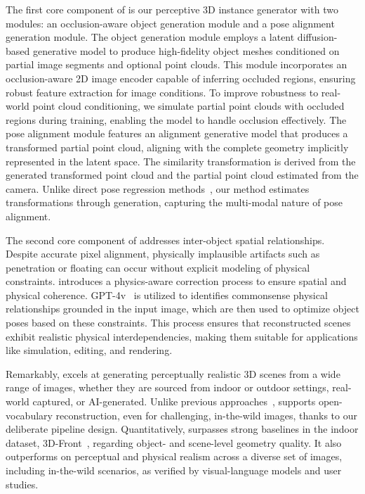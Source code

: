 The first core component of \methodname is our perceptive 3D instance generator with two modules: an occlusion-aware object generation module and a pose alignment generation module. The object generation module employs a latent diffusion-based generative model to produce high-fidelity object meshes conditioned on partial image segments and optional point clouds. This module incorporates an occlusion-aware 2D image encoder capable of inferring occluded regions, ensuring robust feature extraction for image conditions. To improve robustness to real-world point cloud conditioning, we simulate partial point clouds with occluded regions during training, enabling the model to handle occlusion effectively. 
The pose alignment module features an alignment generative model that produces a transformed partial point cloud, aligning with the complete geometry implicitly represented in the latent space. The similarity transformation is derived from the generated transformed point cloud and the partial point cloud estimated from the camera. Unlike direct pose regression methods~\cite{kehl2017ssd,labbe2020cosypose}, our method estimates transformations through generation, capturing the multi-modal nature of pose alignment.

The second core component of \methodname addresses inter-object spatial relationships. Despite accurate pixel alignment, physically implausible artifacts such as penetration or floating can occur without explicit modeling of physical constraints. \methodname introduces a physics-aware correction process to ensure spatial and physical coherence. GPT-4v~\cite{achiam2023gpt} is utilized to identifies commonsense physical relationships grounded in the input image, which are then used to optimize object poses based on these constraints. This process ensures that reconstructed scenes exhibit realistic physical interdependencies, making them suitable for applications like simulation, editing, and rendering.



Remarkably, \methodname excels at generating perceptually realistic 3D scenes from a wide range of images, whether they are sourced from indoor or outdoor settings, real-world captured, or AI-generated. Unlike previous approaches~\cite{liu2022towards,dai2024automated}, \methodname supports open-vocabulary reconstruction, even for challenging, in-the-wild images, thanks to our deliberate pipeline design.
Quantitatively, \methodname surpasses strong baselines in the indoor dataset, 3D-Front~\cite{fu20213d}, regarding object- and scene-level geometry quality. It also outperforms on perceptual and physical realism across a diverse set of images, including in-the-wild scenarios, as verified by visual-language models and user studies.


